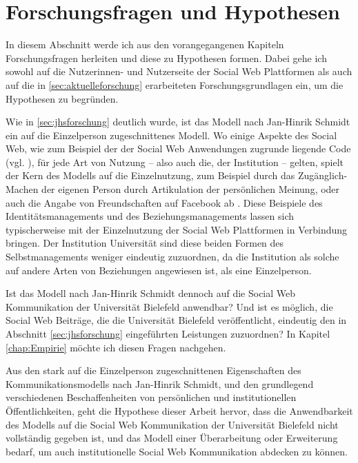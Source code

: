 \section{Forschungsfragen und Hypothesen}
\label{sec:hypothesen}

In diesem Abschnitt werde ich aus den vorangegangenen Kapiteln Forschungsfragen herleiten und diese zu Hypothesen formen. Dabei gehe ich sowohl auf die Nutzerinnen- und Nutzerseite der Social Web Plattformen als auch auf die in \ref{sec:aktuelleforschung} erarbeiteten Forschungsgrundlagen ein, um die Hypothesen zu begründen.

Wie in \ref{sec:jhsforschung} deutlich wurde, ist das Modell nach Jan-Hinrik Schmidt ein auf die Einzelperson zugeschnittenes Modell. Wo einige Aspekte des Social Web, wie zum Beispiel der der Social Web Anwendungen zugrunde liegende Code (vgl. \cite{schmidt2008neu}), für jede Art von Nutzung -- also auch die, der Institution -- gelten, spielt der Kern des Modells auf die Einzelnutzung, zum Beispiel durch das Zugänglich-Machen der eigenen Person durch Artikulation der persönlichen Meinung, oder auch die Angabe von Freundschaften auf Facebook ab \cite{schmidt2008neu}. Diese Beispiele des Identitätsmanagements und des Beziehungsmanagements lassen sich typischerweise mit der Einzelnutzung der Social Web Plattformen in Verbindung bringen. Der Institution Universität sind diese beiden Formen des Selbstmanagements weniger eindeutig zuzuordnen, da die Institution als solche auf andere Arten von Beziehungen angewiesen ist, als eine Einzelperson. 

Ist das Modell nach Jan-Hinrik Schmidt dennoch auf die Social Web Kommunikation der Universität Bielefeld anwendbar? Und ist es möglich, die Social Web Beiträge, die die Universität Bielefeld veröffentlicht, eindeutig den in Abschnitt \ref{sec:jhsforschung} eingeführten Leistungen zuzuordnen? In Kapitel \ref{chap:Empirie} möchte ich diesen Fragen nachgehen. \smallskip

Aus den stark auf die Einzelperson zugeschnittenen Eigenschaften des Kommunikationsmodells nach Jan-Hinrik Schmidt, und den grundlegend verschiedenen Beschaffenheiten von persönlichen und institutionellen Öffentlichkeiten, geht die Hypothese dieser Arbeit hervor, dass die Anwendbarkeit des Modells auf die Social Web Kommunikation der Universität Bielefeld nicht vollständig gegeben ist, und das Modell einer Überarbeitung oder Erweiterung bedarf, um auch institutionelle Social Web Kommunikation abdecken zu können.

